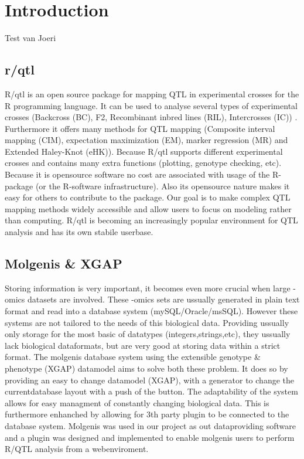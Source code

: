 \section{Introduction}
Test van Joeri
\subsection{r/qtl}
R/qtl is an open source package for mapping QTL in experimental crosses for the R programming language\cite{broman09}\cite{broman03}.
It can be used to analyse several types of experimental crosses (Backcross (BC), F2, Recombinant inbred lines (RIL), Intercrosses (IC)) 
. Furthermore it offers many methods for QTL mapping (Composite interval mapping (CIM), expectation maximization (EM), marker regression (MR) and 
Extended Haley-Knot (eHK)). Because R/qtl supports different experimental crosses and contains many extra functions (plotting, genotype checking, etc).
Because it is opensource software no cost are associated with usage of the R-package (or the R-software infrastructure). Also its opensource nature
 makes it easy for others to contribute to the package. 
Our goal is to make complex QTL mapping methods widely accessible and allow users to focus on modeling rather than computing. R/qtl 
is becoming an increasingly popular environment for QTL analysis and has its own stabile userbase\cite{broman03}.
\subsection{Molgenis \& XGAP}
Storing information is very important, it becomes even more crucial when large -omics datasets are involved. These -omics sets are ussually generated 
in plain text format and read into a database system (mySQL/Oracle/msSQL). However these systems are not tailored to the needs of this biological data.
Providing ussually only storage for the most basic of datatypes (integers,strings,etc), they ussually lack biological dataformats, but are very good 
at storing data within a strict format. The molgenis database system using the extensible genotype \& phenotype (XGAP) datamodel aims to solve both these problem.
It does so by providing an easy to change datamodel (XGAP), with a generator to change the currentdatabase layout with a push of the button. The adaptability
of the system allows for easy managment of constantly changing biological data. This is furthermore enhanched by allowing for 3th party plugin to be 
connected to the database system. Molgenis was used in our project as out dataproviding software and a plugin was designed and implemented to enable 
molgenis users to perform R/QTL analysis from a webenviroment.
